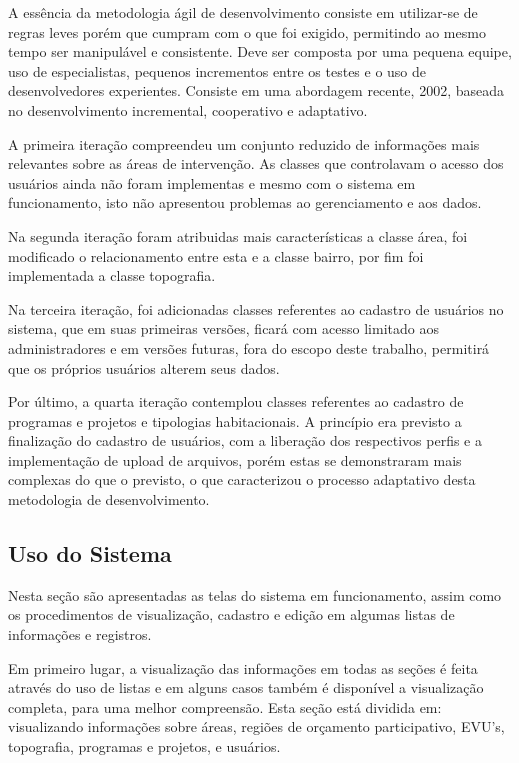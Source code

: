 \documentclass[10pt, twocolumn]{article}
\begin{document}
A essência da metodologia ágil de desenvolvimento consiste em utilizar-se de regras leves porém que cumpram com o que foi exigido, permitindo ao mesmo tempo ser manipulável e consistente. Deve ser composta por uma pequena equipe, uso de especialistas, pequenos incrementos entre os testes e o uso de desenvolvedores experientes. Consiste em uma abordagem recente, 2002, baseada no desenvolvimento incremental, cooperativo e adaptativo.

A primeira iteração compreendeu um conjunto reduzido de informações mais relevantes sobre as áreas de intervenção. As classes que controlavam o acesso dos usuários ainda não foram implementas e mesmo com o sistema em funcionamento, isto não apresentou problemas ao gerenciamento e aos dados.

Na segunda iteração foram atribuidas mais características a classe área, foi modificado o relacionamento entre esta e a classe bairro, por fim foi implementada a classe topografia.

Na terceira iteração, foi adicionadas classes referentes ao cadastro de usuários no sistema, que em suas primeiras versões, ficará com acesso limitado aos administradores e em versões futuras, fora do escopo deste trabalho, permitirá que os próprios usuários alterem seus dados.

Por último, a quarta iteração contemplou classes referentes ao cadastro de programas e projetos e tipologias habitacionais. A princípio era previsto a finalização do cadastro de usuários, com a liberação dos respectivos perfis e a implementação de upload de arquivos, porém estas se demonstraram mais complexas do que o previsto, o que caracterizou o processo adaptativo desta metodologia de desenvolvimento.

\subsection{Uso do Sistema}
\label{rect:us}
Nesta seção são apresentadas as telas do sistema em funcionamento, assim como os procedimentos de visualização, cadastro e edição em algumas listas de informações e registros.

Em primeiro lugar, a visualização das informações em todas as seções é feita através do uso de listas e em alguns casos também é disponível a visualização completa, para uma melhor compreensão. Esta seção está dividida em: visualizando informações sobre áreas, regiões de orçamento participativo, EVU's, topografia, programas e projetos, e usuários.
\end{document}
